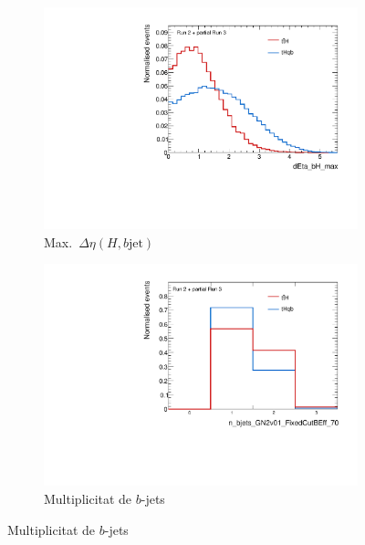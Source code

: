 \begin{figure}[htbp]
  \centering
  \begin{subfigure}[b]{0.45\textwidth}
    \centering
    \includegraphics[width=\textwidth]{images/plots_tH_tHqb_for_thesis/dEta_bH_max_signals_ATLAS.pdf}
    \caption{Max.\ $\Delta \eta (H,b\text{jet})$}
    \label{res:dEta_bH_max}
  \end{subfigure}
  \hfill
  \begin{subfigure}[b]{0.45\textwidth}
    \centering
    \includegraphics[width=\textwidth]{images/plots_tH_tHqb_for_thesis/n_bjets_GN2v01_FixedCutBEff_70_signals_ATLAS.pdf}
    \caption{Multiplicitat de $b$-jets}
    \label{res:n_bjets}
  \end{subfigure}


\end{figure}
